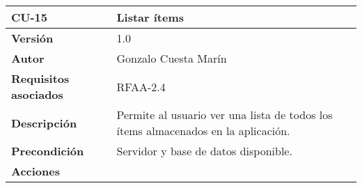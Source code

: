 \begin{longtable}[]{@{}ll@{}}
\toprule
\begin{minipage}[b]{0.19\columnwidth}\raggedright
\textbf{CU-15}\strut
\end{minipage} & \begin{minipage}[b]{0.75\columnwidth}\raggedright
\textbf{Listar ítems}\strut
\end{minipage}\tabularnewline
\midrule
\endhead
\begin{minipage}[t]{0.19\columnwidth}\raggedright
\textbf{Versión}\strut
\end{minipage} & \begin{minipage}[t]{0.75\columnwidth}\raggedright
1.0\strut
\end{minipage}\tabularnewline
\begin{minipage}[t]{0.19\columnwidth}\raggedright
\textbf{Autor}\strut
\end{minipage} & \begin{minipage}[t]{0.75\columnwidth}\raggedright
Gonzalo Cuesta Marín\strut
\end{minipage}\tabularnewline
\begin{minipage}[t]{0.19\columnwidth}\raggedright
\textbf{Requisitos asociados}\strut
\end{minipage} & \begin{minipage}[t]{0.75\columnwidth}\raggedright
RFAA-2.4\strut
\end{minipage}\tabularnewline
\begin{minipage}[t]{0.19\columnwidth}\raggedright
\textbf{Descripción}\strut
\end{minipage} & \begin{minipage}[t]{0.75\columnwidth}\raggedright
Permite al usuario ver una lista de todos los ítems almacenados en la
aplicación.\strut
\end{minipage}\tabularnewline
\begin{minipage}[t]{0.19\columnwidth}\raggedright
\textbf{Precondición}\strut
\end{minipage} & \begin{minipage}[t]{0.75\columnwidth}\raggedright
Servidor y base de datos disponible.\strut
\end{minipage}\tabularnewline
\begin{minipage}[t]{0.19\columnwidth}\raggedright
\textbf{Acciones}\strut
\end{minipage} & \begin{minipage}[t]{0.75\columnwidth}\raggedright
\begin{enumerate}

\end{enumerate}
\end{minipage}
\end{longtable}
